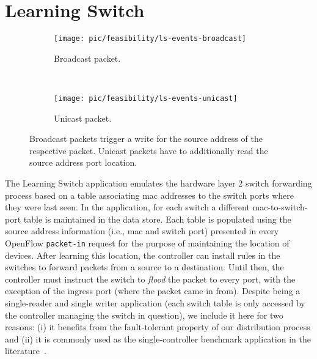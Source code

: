 \documentclass[12pt,openright,twoside]{report}
\begin{document}

\section{Learning Switch} 
\label{sec:feasibility:ls}
\glsresetall

\begin{figure}[ht]
  \begin{subfigure}[b]{0.5\textwidth}
                \centering
                \texttt{[image: pic/feasibility/ls-events-broadcast]}
                \caption{Broadcast packet.}
                \label{fig:ls:interaction:broadcast}
        \end{subfigure}%
        ~
        \begin{subfigure}[b]{0.5\textwidth}
                \centering
                \texttt{[image: pic/feasibility/ls-events-unicast]}
                \caption{Unicast packet.}
                \label{fig:ls:interaction:unicast}
        \end{subfigure}
        \caption[Learning Switch workloads]{Broadcast packets trigger a write for the source address of the respective packet. Unicast packets have to additionally read the source address port location.}
        \label{fig:ls:interaction}
\end{figure}

The Learning Switch application emulates the hardware layer 2 switch forwarding process based on a table associating \gls{mac} addresses to the switch ports where they were last seen. 
In the application, for each switch  a different \gls{mac}-to-switch-port table is maintained in the data store. 
Each table is populated using the source address information (i.e., \gls{mac} and switch port)  presented in every OpenFlow \texttt{packet-in} request for the purpose of maintaining the location of devices. 
After learning this location, the controller can install rules in the switches to forward packets from a source to a destination. 
Until then, the controller must instruct the switch to \emph{flood} the packet to every port, with the exception of the ingress port (where the packet came in from).
Despite being a single-reader and single writer application (each switch table is only accessed by the controller managing the switch in question), we include it here for two reasons: (i) it benefits from the fault-tolerant property of our distribution process and (ii) it is commonly used as the single-controller benchmark application in the literature~\cite{Tootoonchian:2012uia,Erickson:2013er}. 
\end{document}

